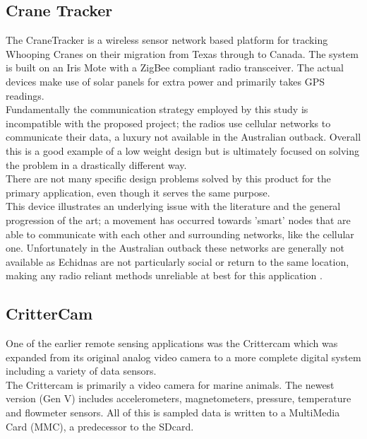 \documentclass[12pt,openany,a4paper]{book}
\begin{document}
		\subsection{Crane Tracker}
			The CraneTracker \cite{Bennett11} is a wireless sensor network based platform for tracking Whooping Cranes on their migration from Texas through to Canada. The system is built on an Iris Mote with a ZigBee compliant radio transceiver. The actual devices make use of solar panels for extra power and primarily takes GPS readings.\\
			
			 Fundamentally the communication strategy employed by this study is incompatible with the proposed project; the radios use cellular networks to communicate their data, a luxury not available in the Australian outback. Overall this is a good example of a low weight design but is ultimately focused on solving the problem in a drastically different way. \\
			 
			 There are not many specific design problems solved by this product for the primary application, even though it serves the same purpose. \\ 
			 
			 This device illustrates an underlying issue with the literature and the general progression of the art; a movement has occurred towards 'smart' nodes that are able to communicate with each other and surrounding networks, like the cellular one. Unfortunately in the Australian outback these networks are generally not available as Echidnas are not particularly social or return to the same location, making any radio reliant methods unreliable at best for this application \cite{Brattstrom73}.
			 
		\newpage
		\subsection{CritterCam}
			One of the earlier remote sensing applications was the Crittercam \cite{Marshall07} which was expanded from its original analog video camera to a more complete digital system including a variety of data sensors. \\
			
			The Crittercam is primarily a video camera for marine animals. The newest version (Gen V) includes accelerometers, magnetometers, pressure, temperature and flowmeter sensors. All of this is sampled data is written to a MultiMedia Card (MMC), a predecessor to the SDcard. \\
			
\end{document}
